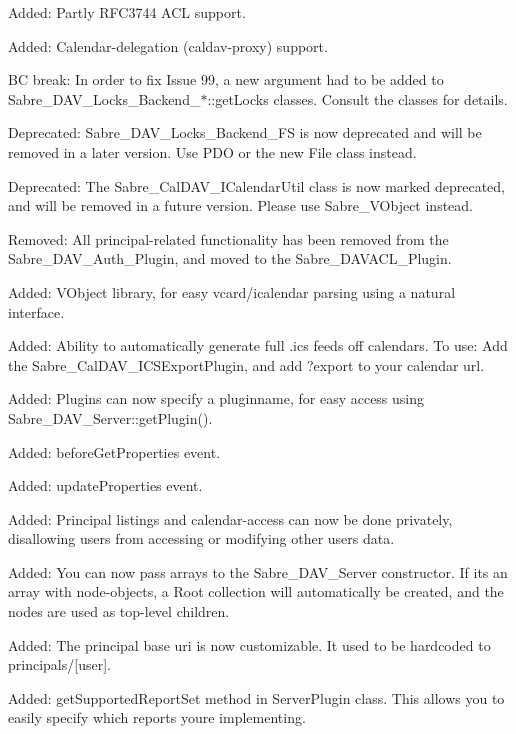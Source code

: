 \begin{DoxyItemize}
\item Added\+: Partly R\+F\+C3744 A\+CL support.
\item Added\+: Calendar-\/delegation (caldav-\/proxy) support.
\item BC break\+: In order to fix Issue 99, a new argument had to be added to Sabre\+\_\+\+D\+A\+V\+\_\+\+Locks\+\_\+\+Backend\+\_\+$\ast$\+::get\+Locks classes. Consult the classes for details.
\item Deprecated\+: Sabre\+\_\+\+D\+A\+V\+\_\+\+Locks\+\_\+\+Backend\+\_\+\+FS is now deprecated and will be removed in a later version. Use P\+DO or the new File class instead.
\item Deprecated\+: The Sabre\+\_\+\+Cal\+D\+A\+V\+\_\+\+I\+Calendar\+Util class is now marked deprecated, and will be removed in a future version. Please use Sabre\+\_\+\+V\+Object instead.
\item Removed\+: All principal-\/related functionality has been removed from the Sabre\+\_\+\+D\+A\+V\+\_\+\+Auth\+\_\+\+Plugin, and moved to the Sabre\+\_\+\+D\+A\+V\+A\+C\+L\+\_\+\+Plugin.
\item Added\+: V\+Object library, for easy vcard/icalendar parsing using a natural interface.
\item Added\+: Ability to automatically generate full .ics feeds off calendars. To use\+: Add the Sabre\+\_\+\+Cal\+D\+A\+V\+\_\+\+I\+C\+S\+Export\+Plugin, and add ?export to your calendar url.
\item Added\+: Plugins can now specify a pluginname, for easy access using Sabre\+\_\+\+D\+A\+V\+\_\+\+Server\+::get\+Plugin().
\item Added\+: before\+Get\+Properties event.
\item Added\+: update\+Properties event.
\item Added\+: Principal listings and calendar-\/access can now be done privately, disallowing users from accessing or modifying other users\textquotesingle{} data.
\item Added\+: You can now pass arrays to the Sabre\+\_\+\+D\+A\+V\+\_\+\+Server constructor. If it\textquotesingle{}s an array with node-\/objects, a Root collection will automatically be created, and the nodes are used as top-\/level children.
\item Added\+: The principal base uri is now customizable. It used to be hardcoded to \textquotesingle{}principals/\mbox{[}user\mbox{]}\textquotesingle{}.
\item Added\+: get\+Supported\+Report\+Set method in Server\+Plugin class. This allows you to easily specify which reports you\textquotesingle{}re implementing.

\end{DoxyItemize}
